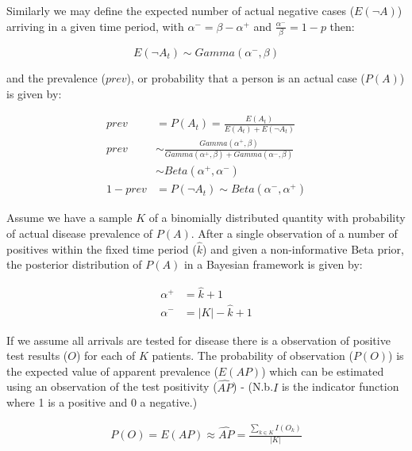 \documentclass[a4paper, 12pt, twoside]{article}
\makeatletter
\newcommand*{\nb}{N.b.\@\xspace}
\makeatother
\begin{document}
Similarly we may define the expected number of actual negative cases (\(E(\neg A)\)) arriving in a given time period, with \(\alpha^- = \beta-\alpha^+\) and \(\frac{\alpha^-}{\beta} = 1-p\) then:

\begin{equation*}
E(\neg A_t) \sim Gamma(\alpha^-, \beta)
\end{equation*}

and the prevalence (\(prev\)), or probability that a person is an actual case (\(P(A)\)) is given by:

\begin{equation*}
\begin{aligned}
prev &= P(A_t) = \frac{E(A_t)}{E(A_t)+E(\neg A_t)} \\
prev &\sim \frac{Gamma(\alpha^+, \beta)}{  Gamma(\alpha^+, \beta) + Gamma(\alpha^-, \beta)} \\
&\sim Beta(\alpha^+,\alpha^-) \\
1 - prev &= P(\neg A_t) \sim {Beta}(\alpha^-, \alpha^+)
\end{aligned}
\end{equation*}

Assume we have a sample \(K\) of a binomially distributed quantity with probability of actual disease prevalence of \(P(A)\). After a single observation of a number of positives within the fixed time period (\(\hat{k}\)) and given a non-informative Beta prior, the posterior distribution of \(P(A)\) in a Bayesian framework is given by:

\begin{equation*}
\begin{aligned}
\alpha^+ &= \hat{k}+1 \\
\alpha^- &= |K|-\hat{k}+1
\end{aligned}
\end{equation*}

If we assume all arrivals are tested for disease there is a observation of positive test results (\(O\)) for each of \(K\) patients. The probability of observation (\(P(O)\)) is the expected value of apparent prevalence (\(E(AP)\)) which can be estimated using an observation of the test positivity (\(\widehat{AP}\)) - (\nb \(I\) is the indicator function where 1 is a positive and 0 a negative.)

\begin{equation*}
\begin{aligned}
P(O) = E(AP) \approx \widehat{AP} = \frac{\sum_{k \in K}{I(O_k)}}{|K|}
\end{aligned}
\end{equation*}
\end{document}
